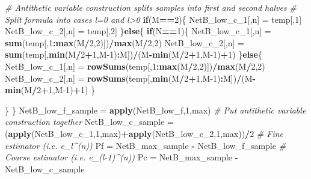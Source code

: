 \documentclass[
]{article}
\newenvironment{Shaded}{\begin{snugshade}}{\end{snugshade}}
\newcommand{\CommentTok}[1]{\textcolor[rgb]{0.56,0.35,0.01}{\textit{#1}}}
\newcommand{\ControlFlowTok}[1]{\textcolor[rgb]{0.13,0.29,0.53}{\textbf{#1}}}
\newcommand{\DecValTok}[1]{\textcolor[rgb]{0.00,0.00,0.81}{#1}}
\newcommand{\KeywordTok}[1]{\textcolor[rgb]{0.13,0.29,0.53}{\textbf{#1}}}
\newcommand{\NormalTok}[1]{#1}
\newcommand{\OperatorTok}[1]{\textcolor[rgb]{0.81,0.36,0.00}{\textbf{#1}}}
\newcommand{\StringTok}[1]{\textcolor[rgb]{0.31,0.60,0.02}{#1}}
\begin{document}
\begin{Shaded}
\begin{Highlighting}[]
{    \CommentTok{# Antithetic variable construction splits samples into first and second halves}
    \CommentTok{# Split formula into cases l=0 and l>0}
    \ControlFlowTok{if}\NormalTok{(M}\OperatorTok{==}\DecValTok{2}\NormalTok{)\{}
\NormalTok{      NetB_low_c_}\DecValTok{1}\NormalTok{[,n] =}\StringTok{ }\NormalTok{temp[,}\DecValTok{1}\NormalTok{]}
\NormalTok{      NetB_low_c_}\DecValTok{2}\NormalTok{[,n] =}\StringTok{ }\NormalTok{temp[,}\DecValTok{2}\NormalTok{]}
\NormalTok{    \}}\ControlFlowTok{else}\NormalTok{\{}
      \ControlFlowTok{if}\NormalTok{(N}\OperatorTok{==}\DecValTok{1}\NormalTok{)\{}
\NormalTok{        NetB_low_c_}\DecValTok{1}\NormalTok{[,n] =}\StringTok{ }\KeywordTok{sum}\NormalTok{(temp[,}\DecValTok{1}\OperatorTok{:}\KeywordTok{max}\NormalTok{(M}\OperatorTok{/}\DecValTok{2}\NormalTok{,}\DecValTok{2}\NormalTok{)])}\OperatorTok{/}\KeywordTok{max}\NormalTok{(M}\OperatorTok{/}\DecValTok{2}\NormalTok{,}\DecValTok{2}\NormalTok{)}
\NormalTok{        NetB_low_c_}\DecValTok{2}\NormalTok{[,n] =}\StringTok{ }\KeywordTok{sum}\NormalTok{(temp[,}\KeywordTok{min}\NormalTok{(M}\OperatorTok{/}\DecValTok{2}\OperatorTok{+}\DecValTok{1}\NormalTok{,M}\DecValTok{-1}\NormalTok{)}\OperatorTok{:}\NormalTok{M])}\OperatorTok{/}\NormalTok{(M}\OperatorTok{-}\KeywordTok{min}\NormalTok{(M}\OperatorTok{/}\DecValTok{2}\OperatorTok{+}\DecValTok{1}\NormalTok{,M}\DecValTok{-1}\NormalTok{)}\OperatorTok{+}\DecValTok{1}\NormalTok{)  }
\NormalTok{      \}}\ControlFlowTok{else}\NormalTok{\{}
\NormalTok{        NetB_low_c_}\DecValTok{1}\NormalTok{[,n] =}\StringTok{ }\KeywordTok{rowSums}\NormalTok{(temp[,}\DecValTok{1}\OperatorTok{:}\KeywordTok{max}\NormalTok{(M}\OperatorTok{/}\DecValTok{2}\NormalTok{,}\DecValTok{2}\NormalTok{)])}\OperatorTok{/}\KeywordTok{max}\NormalTok{(M}\OperatorTok{/}\DecValTok{2}\NormalTok{,}\DecValTok{2}\NormalTok{)}
\NormalTok{        NetB_low_c_}\DecValTok{2}\NormalTok{[,n] =}\StringTok{ }\KeywordTok{rowSums}\NormalTok{(temp[,}\KeywordTok{min}\NormalTok{(M}\OperatorTok{/}\DecValTok{2}\OperatorTok{+}\DecValTok{1}\NormalTok{,M}\DecValTok{-1}\NormalTok{)}\OperatorTok{:}\NormalTok{M])}\OperatorTok{/}\NormalTok{(M}\OperatorTok{-}\KeywordTok{min}\NormalTok{(M}\OperatorTok{/}\DecValTok{2}\OperatorTok{+}\DecValTok{1}\NormalTok{,M}\DecValTok{-1}\NormalTok{)}\OperatorTok{+}\DecValTok{1}\NormalTok{)        }
\NormalTok{      \}}

\NormalTok{    \}}
\NormalTok{  \}}
\NormalTok{  NetB_low_f_sample =}\StringTok{ }\KeywordTok{apply}\NormalTok{(NetB_low_f,}\DecValTok{1}\NormalTok{,max)}
  \CommentTok{# Put antithetic variable construction together}
\NormalTok{  NetB_low_c_sample =}\StringTok{ }\NormalTok{(}\KeywordTok{apply}\NormalTok{(NetB_low_c_}\DecValTok{1}\NormalTok{,}\DecValTok{1}\NormalTok{,max)}\OperatorTok{+}\KeywordTok{apply}\NormalTok{(NetB_low_c_}\DecValTok{2}\NormalTok{,}\DecValTok{1}\NormalTok{,max))}\OperatorTok{/}\DecValTok{2}
  \CommentTok{# Fine estimator (i.e. e_l^(n))}
\NormalTok{  Pf =}\StringTok{ }\NormalTok{NetB_max_sample }\OperatorTok{-}\StringTok{ }\NormalTok{NetB_low_f_sample}
  \CommentTok{# Coarse estimator (i.e. e_(l-1)^(n))}
\NormalTok{  Pc =}\StringTok{ }\NormalTok{NetB_max_sample }\OperatorTok{-}\StringTok{ }\NormalTok{NetB_low_c_sample}
  
}
\end{Highlighting}
\end{Shaded}
\end{document}
